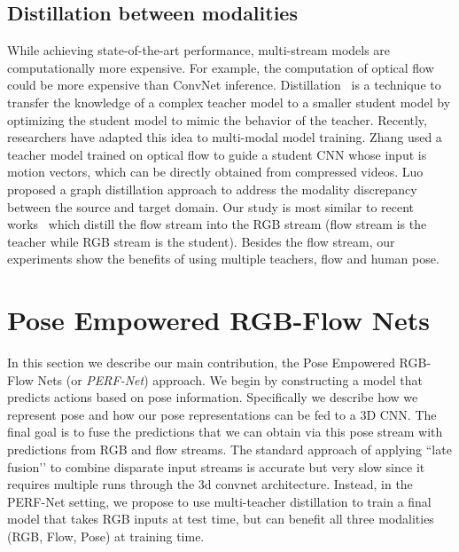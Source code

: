 \documentclass[10pt,twocolumn,letterpaper]{article}
\begin{document}
\subsection{Distillation between modalities}
While achieving state-of-the-art performance, multi-stream models are computationally more expensive. For example, the computation of optical flow could be more expensive than ConvNet inference. Distillation~\cite{bucilua2006model,hinton2015distilling} is a technique to transfer the knowledge of a complex teacher model to a smaller student model by optimizing the student model to mimic the behavior of the teacher. Recently, researchers have adapted this idea to multi-modal model training. Zhang \etal \cite{zhang2016real} used a teacher model trained on optical flow to guide a student CNN whose input is motion vectors, which can be directly obtained from  compressed videos. Luo \etal \cite{luo2018graph} proposed a graph distillation approach to address the modality discrepancy between the source and target domain. Our study is most similar to  recent works~\cite{stroud2020d3d,crasto2019mars} which distill the flow stream into the RGB stream (\eg flow stream is the teacher while RGB stream is the student). Besides the flow stream, our experiments show the benefits of using multiple teachers, \eg flow and human pose. 




\section{Pose Empowered RGB-Flow Nets}
\label{sec:multi-stream-framework}


In this section we describe our main contribution, the Pose Empowered RGB-Flow Nets (or \emph{PERF-Net}) approach.  
We begin by constructing a model that predicts actions based on pose information.  Specifically we describe how we represent pose and how our pose representations can be fed to a 3D CNN.  The final goal is to fuse the predictions that we can obtain via this pose stream with predictions from RGB and flow streams.  The standard approach of applying ``late fusion’’ to combine disparate input streams is accurate but very slow since it requires multiple runs through the 3d convnet architecture.  Instead, in the PERF-Net setting, we propose to use multi-teacher distillation to train a final model that takes RGB inputs at test time, but can benefit all three modalities (RGB, Flow, Pose) at training time.
\end{document}
